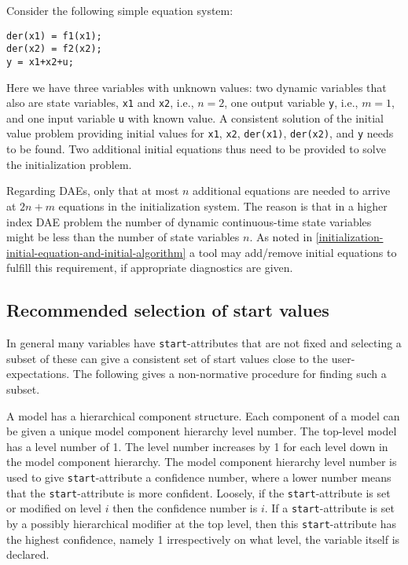 \begin{example}
Consider the following simple equation system:
\begin{lstlisting}[language=modelica]
der(x1) = f1(x1);
der(x2) = f2(x2);
y = x1+x2+u;
\end{lstlisting}

Here we have three variables with unknown values: two dynamic variables that also are state variables, \lstinline!x1! and \lstinline!x2!, i.e., $n=2$, one output variable \lstinline!y!, i.e., $m=1$, and one input variable \lstinline!u! with known value.
A consistent solution of the initial value problem providing initial values for \lstinline!x1!, \lstinline!x2!, \lstinline!der(x1)!, \lstinline!der(x2)!, and \lstinline!y! needs to be found.
Two additional initial equations thus need to be provided to solve the initialization problem.

Regarding DAEs, only that at most $n$ additional equations are needed to arrive at $2n+m$ equations in the initialization system.
The reason is that in a higher index DAE problem the number of dynamic continuous-time state variables might be less than the number of state variables $n$.
As noted in \cref{initialization-initial-equation-and-initial-algorithm} a tool may add/remove initial equations to fulfill this requirement, if appropriate diagnostics are given.
\end{example}

\subsection{Recommended selection of start values}\label{recommended-selection-of-start-values}

In general many variables have \lstinline!start!-attributes that are not fixed and selecting a subset of these can give a consistent set of start values close to the user-expectations.
The following gives a non-normative procedure for finding such a subset.

\begin{nonnormative}
A model has a hierarchical component structure.
Each component of a model can be given a unique model component hierarchy level number.
The top-level model has a level number of 1.
The level number increases by 1 for each level down in the model component hierarchy.
The model component hierarchy level number is used to give \lstinline!start!-attribute a confidence number, where a lower number means that the \lstinline!start!-attribute is more confident.
Loosely, if the \lstinline!start!-attribute is set or modified on level $i$ then the confidence number is $i$.
If a \lstinline!start!-attribute is set by a possibly hierarchical modifier at the top level, then this \lstinline!start!-attribute has the highest confidence, namely 1 irrespectively on what level, the variable itself is declared.
\end{nonnormative}
